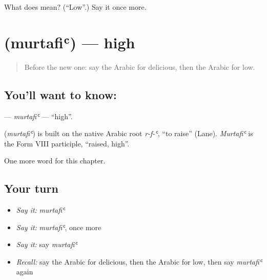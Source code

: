 \begin{tcolorbox}[breakable,colback=teal!4,colframe=teal!35!black,title={Before you move on}]
What does  mean? (\textquotedblleft{}Low\textquotedblright{}.) Say it once more.
\end{tcolorbox}
\section[\texorpdfstring{\ar{مرتفع} (murtafiʿ)}{مرتفع (murtafiʿ)}]{ (murtafiʿ) — high}

\label{lesson:AR-C150-murtafi}



\begin{quote}
Before the new one: say the Arabic for delicious, then the Arabic for low.
\end{quote}

\subsection*{You'll want to know: }
\textbf{} — \emph{murtafiʿ} — \textquotedblleft{}high\textquotedblright{}.

\begin{cousinweb}
\textbf{} (\emph{murtafiʿ}) is built on the native Arabic root \emph{r-f-ʿ}, \textquotedblleft{}to raise\textquotedblright{} (Lane). \emph{Murtafiʿ} is the Form VIII participle, \textquotedblleft{}raised, high\textquotedblright{}.
\end{cousinweb}

\begin{grammarlens}[title={What you've built}]
One more word for this chapter.
\end{grammarlens}

\subsection*{Your turn}
\begin{itemize}
\raggedright
  \item \emph{Say it:} \emph{murtafiʿ}
  \item \emph{Say it:} \emph{murtafiʿ}, once more
  \item \emph{Say it:} say \emph{murtafiʿ}
  \item \emph{Recall:} say the Arabic for delicious, then the Arabic for low, then say \emph{murtafiʿ} again
\end{itemize}

